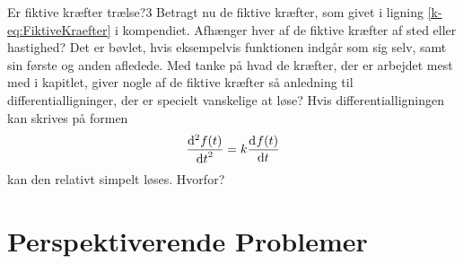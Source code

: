 %
%
\begin{opgave}{Er fiktive kræfter trælse?}{3}
Betragt nu de fiktive kræfter, som givet i ligning \eqref{k-eq:FiktiveKraefter} i kompendiet.
\opg Afhænger hver af de fiktive kræfter af sted eller hastighed?
\opg Det er bøvlet, hvis eksempelvis funktionen indgår som sig selv, samt sin første og anden afledede. Med tanke på hvad de kræfter, der er arbejdet mest med i kapitlet, giver nogle af de fiktive kræfter så anledning til differentialligninger, der er specielt vanskelige at løse?
\opg Hvis differentialligningen kan skrives på formen
\begin{align*}
\dif[2]{t}{f(t)} = k\dif{t}{f(t)}
\end{align*}
kan den relativt simpelt løses. Hvorfor?
\end{opgave}
%
%
\section*{Perspektiverende Problemer}
%
%
